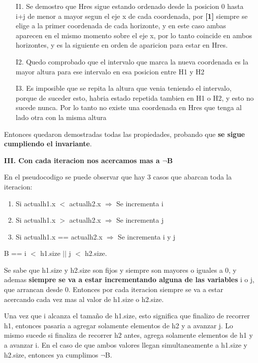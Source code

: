 \documentclass[10pt,a4paper]{article}
\begin{document}
\begin{enumerate}
\begin{itemize}
\item[I1.] Se demostro que Hres sigue estando ordenado desde la posicion 0 hasta i+j de menor a mayor segun el eje x de cada coordenada, por \textbf{[1]} siempre se elige a la primer coordenada de cada horizonte, y en este caso ambas aparecen en el mismo momento sobre el eje x, por lo tanto coincide en ambos horizontes, y es la siguiente en orden de aparicion para estar en Hres.
\item[I2.] Quedo comprobado que el intervalo que marca la nueva coordenada es la mayor altura para ese intervalo en esa posicion entre H1 y H2
\item[I3.] Es imposible que se repita la altura que venia teniendo el intervalo, porque de suceder esto, habria estado repetida tambien en H1 o H2, y esto no sucede nunca. Por lo tanto no existe una coordenada en Hres que tenga al lado otra con la misma altura
\end{itemize}
Entonces quedaron demostradas todas las propiedades, probando que \textbf{se sigue cumpliendo el invariante}.
\end{enumerate}
\newpage
\noindent \textbf{III. Con cada iteracion nos acercamos mas a $\neg$B}

En el pseudocodigo se puede observar que hay 3 casos que abarcan toda la iteracion:
\begin{enumerate}
\item Si actualh1.x $<$ actualh2.x $\Rightarrow$ Se incrementa i
\item Si actualh1.x $>$ actualh2.x $\Rightarrow$ Se incrementa j
\item Si actualh1.x == actualh2.x $\Rightarrow$ Se incrementa i y j
\end{enumerate}

B == i $<$ h1.size $\vert\vert$ j $<$ h2.size. 

Se sabe que h1.size y h2.size son fijos y siempre son mayores o iguales a 0, y ademas \textbf{siempre se va a estar incrementando alguna de las variables} i o j, que arrancan desde 0. Entonces por cada iteracion siempre se va a estar acercando cada vez mas al valor de h1.size o h2.size.

Una vez que i alcanza el tamaño de h1.size, esto significa que finalizo de recorrer h1, entonces pasaria a agregar solamente elementos de h2 y a avanzar j. Lo mismo sucede si finaliza de recorrer h2 antes, agrega solamente elementos de h1 y a avanzar i. En el caso de que ambos valores llegan simultaneamente a h1.size y h2.size, entonces ya cumplimos $\neg$B.
\bigskip
\end{document}
